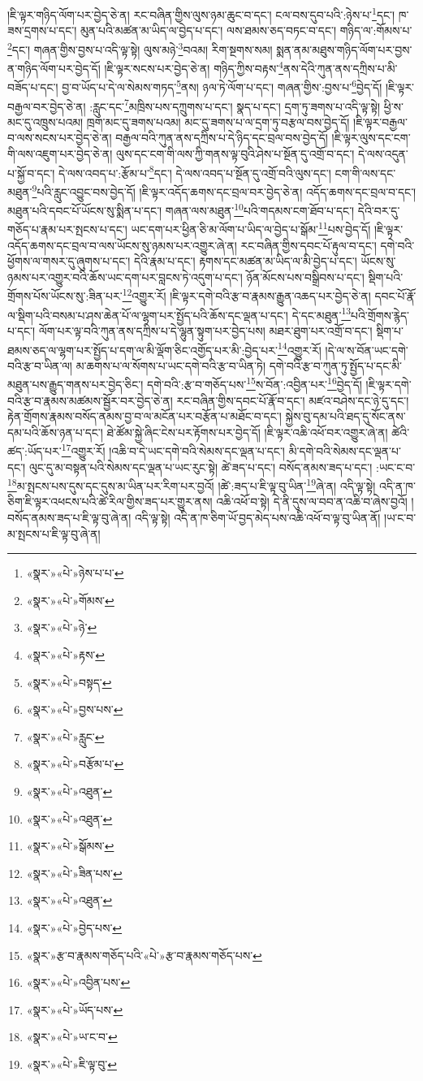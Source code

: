 །ཇི་ལྟར་གཉིད་ལོག་པར་བྱེད་ཅེ་ན། རང་བཞིན་གྱིས་ལུས་ཉམ་ཆུང་བ་དང་། ངལ་བས་དུབ་པའི་:ཉེས་པ་\footnote{«སྣར་»«པེ་»ཉེས་པ་པ་}དང་། ཁ་ཟས་དྲགས་པ་དང་། མུན་པའི་མཚན་མ་ཡིད་ལ་བྱེད་པ་དང་། ལས་ཐམས་ཅད་བཏང་བ་དང་། གཉིད་ལ་:གོམས་པ་\footnote{«སྣར་»«པེ་»གོམས་}དང་། གཞན་གྱིས་བྱས་པ་འདི་ལྟ་སྟེ། ལུས་མཉེ་\footnote{«སྣར་»«པེ་»ཉེ་}བའམ། རིག་སྔགས་སམ། སྨན་ནམ་མཐུས་གཉིད་ལོག་པར་བྱས་ན་གཉིད་ལོག་པར་བྱེད་དོ། །ཇི་ལྟར་སངས་པར་བྱེད་ཅེ་ན། གཉིད་ཀྱིས་བརྟས་\footnote{«སྣར་»«པེ་»རྟས་}ནས་དེའི་ཀུན་ནས་དཀྲིས་པ་མི་བཟོད་པ་དང་། བྱ་བ་ཡོད་པ་དེ་ལ་སེམས་གཏད་\footnote{«སྣར་»«པེ་»བསྟད་}ནས། ཉལ་ཏེ་ལོག་པ་དང་། གཞན་གྱིས་:བྱས་པ་\footnote{«སྣར་»«པེ་»བྱས་པས་}བྱེད་དོ། །ཇི་ལྟར་བརྒྱལ་བར་བྱེད་ཅེ་ན། :རླུང་དང་\footnote{«སྣར་»«པེ་»རླུང་}མཁྲིས་པས་དཀྲུགས་པ་དང་། སྣད་པ་དང་། དྲག་ཏུ་ཟགས་པ་འདི་ལྟ་སྟེ། ཕྱི་ས་མང་དུ་འཁྲུས་པའམ། ཁྲག་མང་དུ་ཟགས་པའམ། མང་དུ་ཟགས་པ་ལ་དྲག་ཏུ་བརྩལ་བས་བྱེད་དོ། །ཇི་ལྟར་བརྒྱལ་བ་ལས་སངས་པར་བྱེད་ཅེ་ན། བརྒྱལ་བའི་ཀུན་ནས་དཀྲིས་པ་དེ་ཉིད་དང་བྲལ་བས་བྱེད་དོ། །ཇི་ལྟར་ལུས་དང་ངག་གི་ལས་འཇུག་པར་བྱེད་ཅེ་ན། ལུས་དང་ངག་གི་ལས་ཀྱི་གནས་ལྟ་བུའི་ཤེས་པ་སྔོན་དུ་འགྲོ་བ་དང་། དེ་ལས་འདུན་པ་སྐྱོ་བ་དང་། དེ་ལས་འབད་པ་:རྩོམ་པ་\footnote{«སྣར་»«པེ་»བརྩོམ་པ་}དང་། དེ་ལས་འབད་པ་སྔོན་དུ་འགྲོ་བའི་ལུས་དང་། ངག་གི་ལས་དང་མཐུན་\footnote{«སྣར་»«པེ་»འཐུན་}པའི་རླུང་འབྱུང་བས་བྱེད་དོ། །ཇི་ལྟར་འདོད་ཆགས་དང་བྲལ་བར་བྱེད་ཅེ་ན། འདོད་ཆགས་དང་བྲལ་བ་དང་། མཐུན་པའི་དབང་པོ་ཡོངས་སུ་སྨིན་པ་དང་། གཞན་ལས་མཐུན་\footnote{«སྣར་»«པེ་»འཐུན་}པའི་གདམས་ངག་ཐོབ་པ་དང་། དེའི་བར་དུ་གཅོད་པ་རྣམ་པར་སྤངས་པ་དང་། ཡང་དག་པར་ཕྱིན་ཅི་མ་ལོག་པ་ཡིད་ལ་བྱེད་པ་སྒོམ་\footnote{«སྣར་»«པེ་»སྒོམས་}པས་བྱེད་དོ། །ཇི་ལྟར་འདོད་ཆགས་དང་བྲལ་བ་ལས་ཡོངས་སུ་ཉམས་པར་འགྱུར་ཞེ་ན། རང་བཞིན་གྱིས་དབང་པོ་རྟུལ་བ་དང་། དགེ་བའི་ཕྱོགས་ལ་གསར་དུ་ཞུགས་པ་དང་། དེའི་རྣམ་པ་དང་། རྟགས་དང་མཚན་མ་ཡིད་ལ་མི་བྱེད་པ་དང་། ཡོངས་སུ་ཉམས་པར་འགྱུར་བའི་ཆོས་ཡང་དག་པར་བླངས་ཏེ་འདུག་པ་དང་། ཉོན་མོངས་པས་བསྒྲིབས་པ་དང་། སྡིག་པའི་གྲོགས་པོས་ཡོངས་སུ་:ཟིན་པར་\footnote{«སྣར་»«པེ་»ཟིན་པས་}འགྱུར་རོ། །ཇི་ལྟར་དགེ་བའི་རྩ་བ་རྣམས་རྒྱུན་འཆད་པར་བྱེད་ཅེ་ན། དབང་པོ་རྣོ་ལ་སྡིག་པའི་བསམ་པ་ཤས་ཆེན་པོ་ལ་ལྷག་པར་སྤྱོད་པའི་ཆོས་དང་ལྡན་པ་དང་། དེ་དང་མཐུན་\footnote{«སྣར་»«པེ་»འཐུན་}པའི་གྲོགས་རྙེད་པ་དང་། ལོག་པར་ལྟ་བའི་ཀུན་ནས་དཀྲིས་པ་དེ་ལྷུན་སྟུག་པར་བྱེད་པས། མཐར་ཐུག་པར་འགྲོ་བ་དང་། སྡིག་པ་ཐམས་ཅད་ལ་ལྷག་པར་སྤྱོད་པ་དག་ལ་མི་ལྡོག་ཅིང་འགྱོད་པར་མི་:བྱེད་པར་\footnote{«སྣར་»«པེ་»བྱེད་པས་}འགྱུར་རོ། །དེ་ལ་ས་བོན་ཡང་དགེ་བའི་རྩ་བ་ཡིན་ལ། མ་ཆགས་པ་ལ་སོགས་པ་ཡང་དགེ་བའི་རྩ་བ་ཡིན་ཏེ། དགེ་བའི་རྩ་བ་ཀུན་ཏུ་སྤྱོད་པ་དང་མི་མཐུན་པས་རྒྱུད་གནས་པར་བྱེད་ཅིང་། དགེ་བའི་:རྩ་བ་གཅོད་པས་\footnote{«སྣར་»རྩ་བ་རྣམས་གཅོད་པའི་«པེ་»རྩ་བ་རྣམས་གཅོད་པས་}ས་བོན་:འབྱིན་པར་\footnote{«སྣར་»«པེ་»འབྱིན་པས་}བྱེད་དོ། །ཇི་ལྟར་དགེ་བའི་རྩ་བ་རྣམས་མཚམས་སྦྱོར་བར་བྱེད་ཅེ་ན། རང་བཞིན་གྱིས་དབང་པོ་རྣོ་བ་དང་། མཛའ་བཤེས་དང་ཉེ་དུ་དང་། རྟེན་གྲོགས་རྣམས་བསོད་ནམས་བྱ་བ་ལ་མངོན་པར་བརྩོན་པ་མཐོང་བ་དང་། སྐྱེས་བུ་དམ་པའི་ཐད་དུ་སོང་ནས་དམ་པའི་ཆོས་ཉན་པ་དང་། ཐེ་ཚོམ་སྐྱེ་ཞིང་ངེས་པར་རྟོགས་པར་བྱེད་དོ། །ཇི་ལྟར་འཆི་འཕོ་བར་འགྱུར་ཞེ་ན། ཚེའི་ཚད་:ཡོད་པར་\footnote{«སྣར་»«པེ་»ཡོད་པས་}འགྱུར་རོ། །འཆི་བ་དེ་ཡང་དགེ་བའི་སེམས་དང་ལྡན་པ་དང་། མི་དགེ་བའི་སེམས་དང་ལྡན་པ་དང་། ལུང་དུ་མ་བསྟན་པའི་སེམས་དང་ལྡན་པ་ཡང་རུང་སྟེ། ཚེ་ཟད་པ་དང་། བསོད་ནམས་ཟད་པ་དང་། :ཡང་ང་བ་\footnote{«སྣར་»«པེ་»ཡ་ང་བ་}མ་སྤངས་པས་དུས་དང་དུས་མ་ཡིན་པར་རིག་པར་བྱའོ། །ཚེ་:ཟད་པ་ཇི་ལྟ་བུ་ཡིན་\footnote{«སྣར་»«པེ་»ཇི་ལྟ་བུ་}ཞེ་ན། འདི་ལྟ་སྟེ། འདི་ན་ཁ་ཅིག་ཇི་ལྟར་འཕངས་པའི་ཚེ་རིལ་གྱིས་ཟད་པར་གྱུར་ནས། འཆི་འཕོ་བ་སྟེ། དེ་ནི་དུས་ལ་བབ་ན་འཆི་བ་ཞེས་བྱའོ། །བསོད་ནམས་ཟད་པ་ཇི་ལྟ་བུ་ཞེ་ན། འདི་ལྟ་སྟེ། འདི་ན་ཁ་ཅིག་ཡོ་བྱད་མེད་པས་འཆི་འཕོ་བ་ལྟ་བུ་ཡིན་ནོ། །ཡ་ང་བ་མ་སྤངས་པ་ཇི་ལྟ་བུ་ཞེ་ན། 